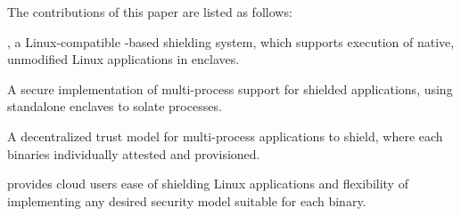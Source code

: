 The contributions of this paper are listed as follows:
\begin{compactitem}
\item \sysname{}, a Linux-compatible \libos{}-based shielding system,
which supports execution of native, unmodified Linux applications
in \sgx{} enclaves.
\item A secure implementation of multi-process support
for shielded applications,
using standalone enclaves to solate processes.
\item A decentralized trust model for multi-process applications to shield,
where each binaries individually attested and provisioned.
\end{compactitem}

\sysname{} provides cloud users
ease of shielding Linux applications
and flexibility of implementing any desired security model
suitable for each binary.

